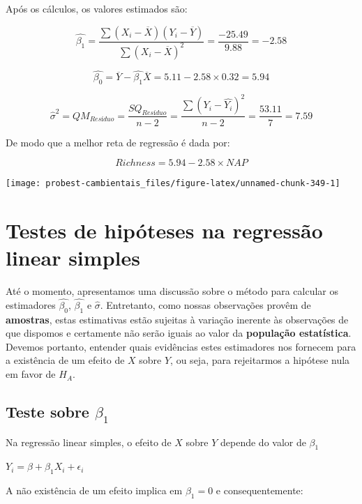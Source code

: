 \documentclass[
]{book}
\begin{document}
Após os cálculos, os valores estimados são:

\[\hat{\beta_1} = \frac{\sum{(X_i - \overline{X})(Y_i - \overline{Y})}}{\sum{(X_i - \overline{X})^2}} = \frac{-25.49}{9.88} = -2.58\]

\[\hat{\beta_0} = \overline{Y} - \hat{\beta_1}\overline{X} = 5.11 -2.58 \times 0.32 = 5.94\]

\[\hat{\sigma}^2 = QM_{Resíduo} = \frac{SQ_{Resíduo}}{n-2} = \frac{\sum{(Y_i-\hat{Y_ i})^2}}{n-2} = \frac{53.11}{7} = 7.59\]

De modo que a melhor reta de regressão é dada por:

\[Richness = 5.94 -2.58 \times NAP\]

\begin{center}\texttt{[image: probest-cambientais\_files/figure-latex/unnamed-chunk-349-1]} \end{center}

\hypertarget{testes-de-hipuxf3teses-na-regressuxe3o-linear-simples}{%
\section{Testes de hipóteses na regressão linear simples}\label{testes-de-hipuxf3teses-na-regressuxe3o-linear-simples}}

Até o momento, apresentamos uma discussão sobre o método para calcular os estimadores \(\hat{\beta_0}\), \(\hat{\beta_1}\) e \(\hat{\sigma}\). Entretanto, como nossas observações provêm de \textbf{amostras}, estas estimativas estão sujeitas à variação inerente às observações de que dispomos e certamente não serão iguais ao valor da \textbf{população estatística}. Devemos portanto, entender quais evidências estes estimadores nos fornecem para a existência de um efeito de \(X\) sobre \(Y\), ou seja, para rejeitarmos a hipótese nula em favor de \(H_A\).

\hypertarget{teste-sobre-beta_1}{%
\subsection{\texorpdfstring{Teste sobre \(\beta_1\)}{Teste sobre \textbackslash beta\_1}}\label{teste-sobre-beta_1}}

Na regressão linear simples, o efeito de \(X\) sobre \(Y\) depende do valor de \(\beta_1\)

\(Y_i = \beta + \beta_1X_i + \epsilon_i\)

A não existência de um efeito implica em \(\beta_1 = 0\) e consequentemente:
\end{document}
